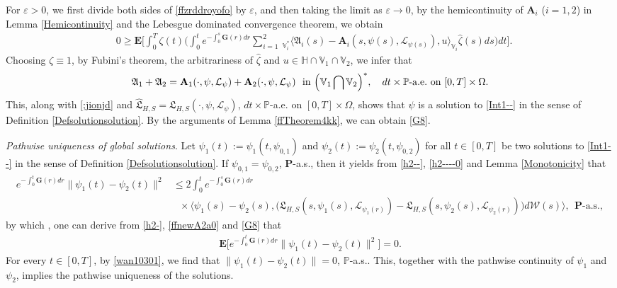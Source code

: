 \documentclass[11pt]{article}
\renewcommand{\leq}{\leqslant}
\renewcommand{\geq}{\geqslant}  %
\numberwithin{equation}{section}
\begin{document}
For $\varepsilon>0$, we first
 divide
	both sides of  \eqref{ffzrddroyofo}  by $\varepsilon$,
	and
	then taking   the limit as $\varepsilon\rightarrow0$,
	by
  the hemicontinuity of
$\textbf{A}_i$ ($i=1,2$) in Lemma \ref{Hemicontinuity}
and
the	Lebesgue dominated convergence theorem,
we obtain
\begin{align}&\label{ffzrdfo}
		0\geq
		\mathbf{E}\Bigg[\int_0^{T}
\zeta(t)\Bigg(
		\int_0^{t}
e^{-\int_0^s\mathbf{G}(r)dr}
		\sum_{i=1}^2\ _{\mathbb{V}_i^*}
		\langle \mathfrak{A}_i(s)-
\mathbf{A}_i(s,\psi(s),
\mathcal{L}_{\psi(s)}) ,u
\rangle_{\mathbb{V}_i}
\widehat{\zeta}(s)
		ds\Bigg)dt\Bigg].
	\end{align}
	Choosing  $\zeta \equiv 1$,
by  Fubini's theorem,   the arbitrariness of
$\widehat{\zeta}$ and $u\in\mathbb{H}\cap\mathbb{V}_1
\cap\mathbb{V}_2$, we  infer
 that $$\mathfrak{A}_1+\mathfrak{A}_2=
\mathbf{A}_1(\cdot,\psi,\mathcal{L}_{\psi}) +\mathbf{A}_2(\cdot,\psi,\mathcal{L}_{\psi})\ \ \mbox{in}\  \Big(\mathbb{V}_1
\bigcap\mathbb{V}_2\Big)^*, \ \ \mbox{ $dt\times\mathbb{P}$-\mbox{a.e.} on $[0,T]\times\Omega$}.
$$
This, along with \eqref{;jionjd} and $\widehat{\mathfrak{L}}_{H,S}=
\mathfrak{L}_{H,S}(\cdot,
\psi,\mathcal{L}_{\psi})$, $dt\times\mathbb{P}$-\mbox{a.e.} on $[0,T]\times\Omega$, shows that $\psi$ is a solution to \eqref{Int1--} in the sense of Definition \ref{Defsolutionsolution}.
By the arguments of Lemma \ref{ffTheorem4kk}, we can obtain  \eqref{G8}.

\emph{Pathwise uniqueness of global solutions}.
Let $\psi_1(t):=\psi_1(t,\psi_{0,1})$ and $\psi_2(t):=\psi_2(t,\psi_{0,2})$ for all $t\in [0, T]$ be two solutions to \eqref{Int1--} in the sense of
	Definition \ref{Defsolutionsolution}.
If $\psi_{0,1}=\psi_{0,2}$, $\textbf{P}$-a.s., then it yields from \eqref{h2--}, \eqref{h2----0} and Lemma \ref{Monotonicity}
	that
	\begin{align*}
	 e^{-\int_0 ^{t}
		\mathbf{G}(r)dr}	\|\psi_1(t)-
		\psi_2(t)\|^2 &\leq
		2
		\int_0^{t}
		e^{-\int^s_{0}
			\mathbf{G}(r)dr}
		\\&\ \ \  \times\big\langle \psi_1(s)-\psi_2(s),
		\big(\mathfrak{L}_{H,S}(s,\psi_1(s),
\mathcal{L}_{\psi_1(r)})
		-\mathfrak{L}_{H,S}(s,\psi_2(s),
\mathcal{L}_{\psi_2(r)})\big)
		d\mathcal{W}(s)\big
\rangle, \ \ \mbox{$\textbf{P}$-a.s.},
	\end{align*}
by  which , one can derive from
\eqref{h2-}, \eqref{ffnewA2a0} and \eqref{G8} that
	\begin{align}\label{wan10301}
	\textbf{E}\bigg [e^{-\int_0 ^{t}
		\mathbf{G}(r)dr}	\|\psi_1(t)-
		\psi_2(t)\|^2\bigg ]=0.
\end{align}	
For every
	$t\in [0, T]$, by \eqref{wan10301}, we find that $\|\psi_1(t)-
		\psi_2(t)\|=0$,
$\mathbb{P}$-a.s.. This, together with the pathwise continuity of
$\psi_1$ and $\psi_2$, implies the pathwise uniqueness of the solutions.
\end{document}
